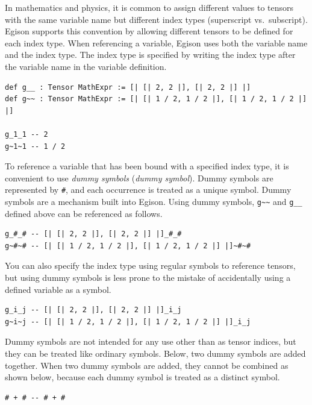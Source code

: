 In mathematics and physics, it is common to assign different values to tensors with the same variable name but different index types (superscript vs.\ subscript).
Egison supports this convention by allowing different tensors to be defined for each index type.
When referencing a variable, Egison uses both the variable name and the index type.
The index type is specified by writing the index type after the variable name in the variable definition.
\begin{lstlisting}[language=egison,numbers=none]
def g__ : Tensor MathExpr := [| [| 2, 2 |], [| 2, 2 |] |]
def g~~ : Tensor MathExpr := [| [| 1 / 2, 1 / 2 |], [| 1 / 2, 1 / 2 |] |]

g_1_1 -- 2
g~1~1 -- 1 / 2
\end{lstlisting}

To reference a variable that has been bound with a specified index type, it is convenient to use \emph{dummy symbols} (\emph{dummy symbol}).
Dummy symbols are represented by \lstinline{#}, and each occurrence is treated as a unique symbol.
Dummy symbols are a mechanism built into Egison.
Using dummy symbols, \lstinline{g~~} and \lstinline{g__} defined above can be referenced as follows.
\begin{lstlisting}[language=egison,numbers=none]
g_#_# -- [| [| 2, 2 |], [| 2, 2 |] |]_#_#
g~#~# -- [| [| 1 / 2, 1 / 2 |], [| 1 / 2, 1 / 2 |] |]~#~#
\end{lstlisting}
You can also specify the index type using regular symbols to reference tensors, but using dummy symbols is less prone to the mistake of accidentally using a defined variable as a symbol.
\begin{lstlisting}[language=egison,numbers=none]
g_i_j -- [| [| 2, 2 |], [| 2, 2 |] |]_i_j
g~i~j -- [| [| 1 / 2, 1 / 2 |], [| 1 / 2, 1 / 2 |] |]_i_j
\end{lstlisting}

Dummy symbols are not intended for any use other than as tensor indices, but they can be treated like ordinary symbols.
Below, two dummy symbols are added together.
When two dummy symbols are added, they cannot be combined as shown below, because each dummy symbol is treated as a distinct symbol.
\begin{lstlisting}[language=egison,numbers=none]
# + # -- # + #
\end{lstlisting}

